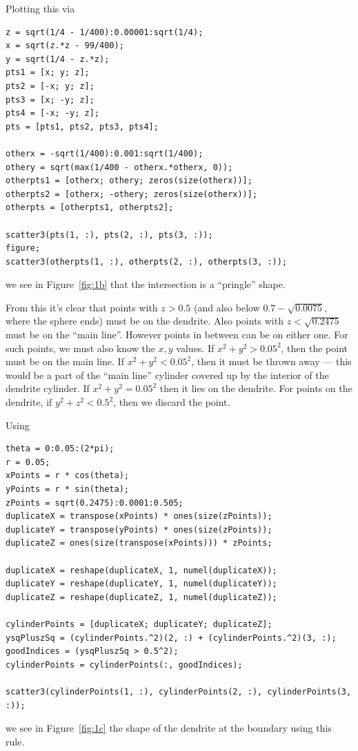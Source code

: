 \documentclass[a4paper,10pt]{article}
\begin{document}
Plotting this via
\begin{verbatim}
z = sqrt(1/4 - 1/400):0.00001:sqrt(1/4);
x = sqrt(z.*z - 99/400);
y = sqrt(1/4 - z.*z);
pts1 = [x; y; z];
pts2 = [-x; y; z];
pts3 = [x; -y; z];
pts4 = [-x; -y; z];
pts = [pts1, pts2, pts3, pts4];

otherx = -sqrt(1/400):0.001:sqrt(1/400);
othery = sqrt(max(1/400 - otherx.*otherx, 0));
otherpts1 = [otherx; othery; zeros(size(otherx))];
otherpts2 = [otherx; -othery; zeros(size(otherx))];
otherpts = [otherpts1, otherpts2];

scatter3(pts(1, :), pts(2, :), pts(3, :));
figure;
scatter3(otherpts(1, :), otherpts(2, :), otherpts(3, :));
\end{verbatim}
we see in Figure~\ref{fig:1b} that the intersection is a ``pringle'' shape.

From this it's clear that points with \(z > 0.5\) (and also below
\(0.7 - \sqrt{0.0075}\), where the sphere ends) must be on the dendrite.
Also points with \(z < \sqrt{0.2475}\) must be on the ``main line''. However
points in between can be on either one. For such points, we must also know
the \(x, y\) values. If \(x^2 + y^2 > 0.05^2\), then the point must be on
the main line. If \(x^2 + y^2 < 0.05^2\), then it must be thrown away ---
this would be a part of the ``main line'' cylinder covered up by the interior
of the dendrite cylinder. If \(x^2 + y^2 = 0.05^2\) then it lies on the
dendrite. For points on the dendrite, if \(y^2 + z^2 < 0.5^2\), then we
discard the point.

Using
\begin{verbatim}
theta = 0:0.05:(2*pi);
r = 0.05;
xPoints = r * cos(theta);
yPoints = r * sin(theta);
zPoints = sqrt(0.2475):0.0001:0.505;
duplicateX = transpose(xPoints) * ones(size(zPoints));
duplicateY = transpose(yPoints) * ones(size(zPoints));
duplicateZ = ones(size(transpose(xPoints))) * zPoints;

duplicateX = reshape(duplicateX, 1, numel(duplicateX));
duplicateY = reshape(duplicateY, 1, numel(duplicateY));
duplicateZ = reshape(duplicateZ, 1, numel(duplicateZ));

cylinderPoints = [duplicateX; duplicateY; duplicateZ];
ysqPluszSq = (cylinderPoints.^2)(2, :) + (cylinderPoints.^2)(3, :);
goodIndices = (ysqPluszSq > 0.5^2);
cylinderPoints = cylinderPoints(:, goodIndices);

scatter3(cylinderPoints(1, :), cylinderPoints(2, :), cylinderPoints(3, :));
\end{verbatim}
we see in Figure~\ref{fig:1c} the shape of the dendrite at the boundary
using this rule.
\end{document}

